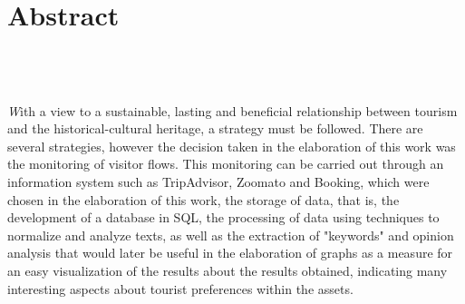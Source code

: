 \chapter{Abstract}
\section*{\textit{\TITULO}\\  {\small{\textit{\SUBTITULO}}}}

\textit
With a view to a sustainable, lasting and beneficial relationship between tourism and the historical-cultural heritage, a strategy must be followed. There are several strategies, however the decision taken in the elaboration of this work was the monitoring of visitor flows. This monitoring can be carried out through an information system such as TripAdvisor, Zoomato and Booking, which were chosen in the elaboration of this work, the storage of data, that is, the development of a database in SQL, the processing of data using techniques to normalize and analyze texts, as well as the extraction of "keywords" and opinion analysis that would later be useful in the elaboration of graphs as a measure for an easy visualization of the results about the results obtained, indicating many interesting aspects about tourist preferences within the assets.


